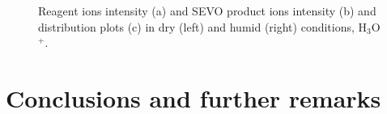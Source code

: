\begin{figure}
\caption{Reagent ions intensity (a) and SEVO product ions intensity (b) and distribution plots (c) in dry (left) and humid (right) conditions, H$_3$O$^+$.}
\label{fig:sevo_h3o}
\end{figure}



\section{Conclusions and further remarks}















